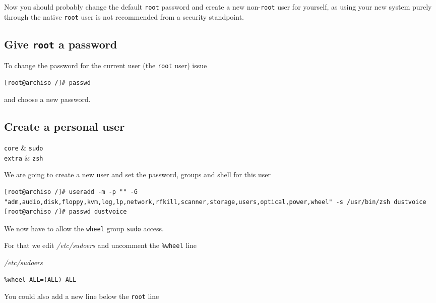 \documentclass[10pt]{dustdoc}
\begin{document}
Now you should probably change the default \texttt{root} password and create a new non-\texttt{root} user for yourself, as using your new system purely through the native \texttt{root} user is not recommended from a security standpoint.

\subsection{Give \texttt{root} a password}
\label{sec:give-root-a-password}

To change the password for the current user (the \texttt{root} user) issue

\begin{verbatim}
[root@archiso /]# passwd
\end{verbatim}

\noindent
and choose a new password.

\subsection{Create a personal user}
\label{sec:create-a-personal-user}

\begin{packagetable}
    \texttt{core} & \texttt{sudo} \\
    \texttt{extra} & \texttt{zsh} \\
\end{packagetable}

We are going to create a new user and set the password, groups and shell for this user

\begin{verbatim}
[root@archiso /]# useradd -m -p "" -G "adm,audio,disk,floppy,kvm,log,lp,network,rfkill,scanner,storage,users,optical,power,wheel" -s /usr/bin/zsh dustvoice
[root@archiso /]# passwd dustvoice
\end{verbatim}

We now have to allow the \texttt{wheel} group \texttt{sudo} access.

For that we edit \textit{/etc/sudoers} and uncomment the \texttt{\%wheel} line

\begin{mintedlisting}
    \caption*{\textit{/etc/sudoers}}
    \begin{verbatim}
%wheel ALL=(ALL) ALL
    \end{verbatim}
\end{mintedlisting}

You could also add a new line below the \texttt{root} line
\end{document}
